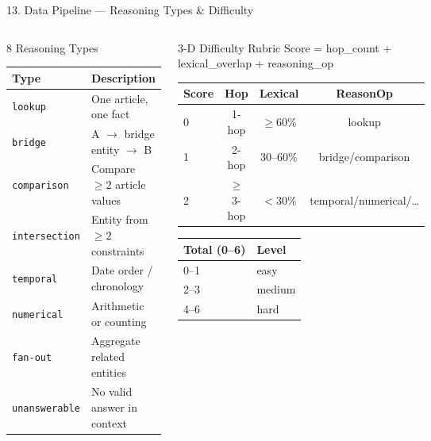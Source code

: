 \documentclass[aspectratio=169]{beamer}
\newcommand{\pos}[1]{\textcolor{positive}{#1}}
\newcommand{\con}[1]{\textcolor{negative}{#1}}
\newcommand{\HL}[1]{\textcolor{emphasis}{#1}}
\begin{document}
\begin{frame}[shrink=15]{13. Data Pipeline — Reasoning Types \& Difficulty}
\begin{columns}[T]
\begin{block}{8 Reasoning Types}
\begin{tabular}{@{}lp{3.5cm}@{}}
\toprule
\textbf{Type} & \textbf{Description} \\
\midrule
\texttt{lookup}        & One article, one fact \\
\texttt{bridge}        & A $\to$ bridge entity $\to$ B \\
\texttt{comparison}    & Compare $\geq 2$ article values \\
\texttt{intersection}  & Entity from $\geq 2$ constraints \\
\texttt{temporal}      & Date order / chronology \\
\texttt{numerical}     & Arithmetic or counting \\
\texttt{fan-out}       & Aggregate related entities \\
\texttt{unanswerable}  & No valid answer in context \\
\bottomrule
\end{tabular}
\end{block}

\begin{block}{3-D Difficulty Rubric}
{\small Score = hop\_count + lexical\_overlap + reasoning\_op}\\[4pt]
\begin{tabular}{@{}lccc@{}}
\toprule
\textbf{Score} & \textbf{Hop} & \textbf{Lexical} & \textbf{ReasonOp} \\
\midrule
0 & 1-hop     & $\geq 60\%$ & lookup \\
1 & 2-hop     & 30--60\%    & bridge/comparison \\
2 & $\geq$3-hop & $< 30\%$ & temporal/numerical/\ldots \\
\bottomrule
\end{tabular}

\vspace{4pt}
\begin{tabular}{@{}ll@{}}
\toprule
\textbf{Total (0--6)} & \textbf{Level} \\
\midrule
0--1 & \HL{easy} \\
2--3 & \con{medium} \\
4--6 & \pos{hard} \\
\bottomrule
\end{tabular}
\end{block}
\end{columns}
\end{frame}
\end{document}
